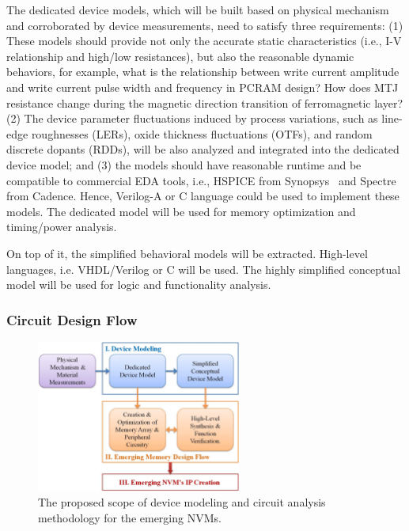 The dedicated device models, which will be built based on physical mechanism and corroborated by device measurements, need to satisfy three requirements: (1) These models should provide not only the accurate static characteristics (i.e., I-V relationship and high/low resistances), but also the reasonable dynamic behaviors, for example, what is the relationship between write current amplitude and write current pulse width and frequency in PCRAM design? How does MTJ resistance change during the magnetic direction transition of ferromagnetic layer? (2) The device parameter fluctuations induced by process variations, such as line-edge roughnesses (LERs), oxide thickness fluctuations (OTFs), and random discrete dopants (RDDs), will be also analyzed and integrated into the dedicated device model; and (3) the models should have reasonable runtime and be compatible to commercial EDA tools, i.e., HSPICE from Synopsys~\cite{synopsys} and Spectre from Cadence. Hence, Verilog-A or C language could be used to implement these models. The dedicated model will be used for memory optimization and timing/power analysis.

On top of it, the simplified behavioral models will be extracted. High-level languages, i.e. VHDL/Verilog or C will be used. The highly simplified conceptual model will be used for logic and functionality analysis.

\subsubsection{Circuit Design Flow}

\begin{figure}\centering \centering   \includegraphics[width=0.6\textwidth]{./figure/HL-flow.pdf}
\caption{The proposed scope of device modeling and circuit analysis methodology for the emerging NVMs.}\label{flow}  \vspace{-20pt}
\end{figure}

